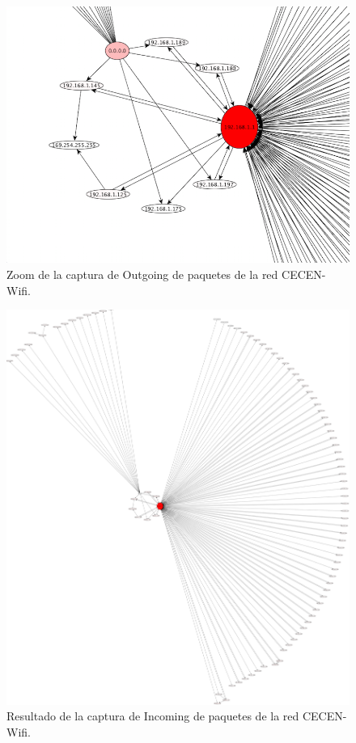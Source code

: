 \documentclass[10pt, a4paper]{article}
\begin{document}
\begin{figure}[H] %
\begin{center}
\includegraphics[width=400pt]{../imgs/zoom-cecen-outgoing.png}
\caption{Zoom de la captura de Outgoing de paquetes de la red CECEN-Wifi.}
\end{center}
\end{figure}

\begin{figure}[H] %
\begin{center}
\includegraphics[width=400pt]{../imgs/cecen-incoming.png}
\caption{Resultado de la captura de Incoming de paquetes de la red CECEN-Wifi.}
\end{center}
\end{figure}
\end{document}

